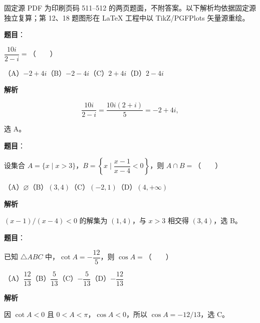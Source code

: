 

\begin{gktip}
固定源 PDF 为印刷页码 511–512 的两页题面，不附答案。以下解析均依据固定源独立复算；第 12、18 题图形在 LaTeX 工程中以 TikZ/PGFPlots 矢量源重绘。
\end{gktip}

\begin{answer}

\textbf{题目}：

$\dfrac{10i}{2-i}=$\mbox{（　　）}

（A）$-2+4i$\quad（B）$-2-4i$\quad（C）$2+4i$\quad（D）$2-4i$

\textbf{解析}

\nopagebreak[4]
\[
\frac{10i}{2-i}=\frac{10i(2+i)}5=-2+4i,
\]

选 A。


\end{answer}
\begin{answer}

\textbf{题目}：

设集合 $A=\{x\mid x>3\}$，$B=\left\{x\mid\dfrac{x-1}{x-4}<0\right\}$，则 $A\cap B=$\mbox{（　　）}

（A）$\varnothing$\quad（B）$(3,4)$\quad（C）$(-2,1)$\quad（D）$(4,+\infty)$

\textbf{解析}

$(x-1)/(x-4)<0$ 的解集为 $(1,4)$，与 $x>3$ 相交得
$(3,4)$，选 B。


\end{answer}
\begin{answer}

\textbf{题目}：

已知 $\triangle ABC$ 中，$\cot A=-\dfrac{12}{5}$，则 $\cos A=$\mbox{（　　）}

（A）$\dfrac{12}{13}$\quad（B）$\dfrac5{13}$\quad（C）$-\dfrac5{13}$\quad（D）$-\dfrac{12}{13}$

\textbf{解析}

因 $\cot A<0$ 且 $0<A<\pi$，$\cos A<0$，所以
$\cos A=-12/13$，选 C。


\end{answer}
